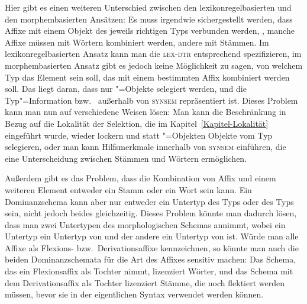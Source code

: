 Hier gibt es einen weiteren Unterschied zwischen den lexikonregelbasierten und den morphembasierten Ansätzen:
Es muss irgendwie sichergestellt werden, dass Affixe mit einem Objekt des jeweils richtigen Typs verbunden werden,
\dash, manche Affixe müssen mit Wörtern kombiniert werden, andere mit Stämmen. 
Im lexikonregelbasierten Ansatz kann
man die \textsc{lex-dtr} entsprechend spezifizieren, im morphembasierten Ansatz gibt es jedoch keine Möglichkeit
zu sagen, von welchem Typ das Element sein soll, das mit einem bestimmten Affix kombiniert werden soll. Das liegt daran,
dass nur "=Objekte selegiert werden, und die Typ"=Information  bzw.\  außerhalb
von \textsc{synsem} repräsentiert ist. Dieses Problem kann man nun auf verschiedene Weisen lösen:
Man kann die Beschränkung in Bezug auf die Lokalität der Selektion, die im Kapitel~\ref{Kapitel-Lokalität}
eingeführt wurde, wieder lockern und statt "=Objekten Objekte vom Typ  selegieren, oder
man kann Hilfsmerkmale innerhalb von \textsc{synsem} einführen, die eine Unterscheidung zwischen Stämmen und Wörtern
ermöglichen.

Außerdem gibt es das Problem, dass die Kombination von Affix und einem weiteren Element entweder ein
Stamm oder ein Wort sein kann. Ein Dominanzschema kann aber nur entweder ein
Untertyp des Typs  oder des Typs  sein, nicht jedoch beides
gleichzeitig. Dieses Problem könnte man dadurch lösen, dass man zwei Untertypen des morphologischen
Schemas annimmt, wobei ein Untertyp ein Untertyp von  und der andere ein Untertyp von
 ist. Würde man alle Affixe als Flexions- bzw.\ Derivationsaffixe kennzeichnen, so könnte
man auch die beiden Dominanzschemata für die Art des Affixes sensitiv machen: Das Schema, das ein
Flexionsaffix als Tochter nimmt, lizenziert Wörter, und das Schema mit dem Derivationsaffix als
Tochter lizenziert Stämme, die noch flektiert werden müssen, bevor sie in der eigentlichen Syntax
verwendet werden können.





